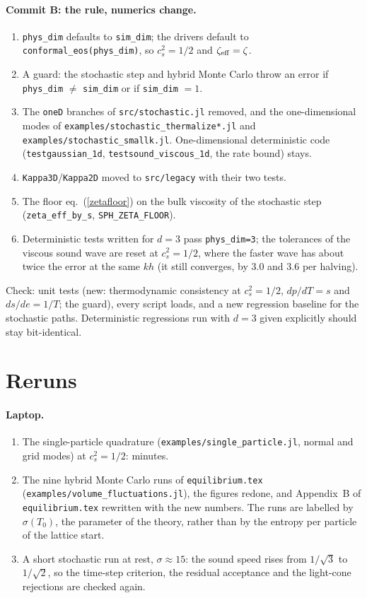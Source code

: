 \documentclass[11pt,aps,preprint,nofootinbib,superscriptaddress,tightenlines]{revtex4-2}
\def\Eq#1{eq.~(\ref{#1})}
\let\oldparagraph\paragraph
\renewcommand{\paragraph}{\par\bigskip\oldparagraph}
\begin{document}
\paragraph{Commit B: the rule, numerics change.}
\begin{enumerate}
\item \texttt{phys\_dim} defaults to \texttt{sim\_dim}; the drivers default to \texttt{conformal\_eos(phys\_dim)}, so $c_s^2=1/2$ and
  $\zeta_{\rm eff}=\zeta$.
\item A guard: the stochastic step and hybrid Monte Carlo throw an error if \texttt{phys\_dim} $\neq$ \texttt{sim\_dim} or if
  \texttt{sim\_dim} $=1$.
\item The \texttt{oneD} branches of \texttt{src/stochastic.jl} removed, and the one-dimensional modes of
  \texttt{examples/stochastic\_thermalize*.jl} and \texttt{examples/stochastic\_smallk.jl}.  One-dimensional deterministic code
  (\texttt{testgaussian\_1d}, \texttt{testsound\_viscous\_1d}, the rate bound) stays.
\item \texttt{Kappa3D}/\texttt{Kappa2D} moved to \texttt{src/legacy} with their two tests.
\item The floor \Eq{zetafloor} on the bulk viscosity of the stochastic step (\texttt{zeta\_eff\_by\_s}, \texttt{SPH\_ZETA\_FLOOR}).
\item Deterministic tests written for $d=3$ pass \texttt{phys\_dim=3}; the tolerances of the viscous sound wave are reset at
  $c_s^2=1/2$, where the faster wave has about twice the error at the same $kh$ (it still converges, by $3.0$ and $3.6$ per halving).
\end{enumerate}
Check: unit tests (new: thermodynamic consistency at $c_s^2=1/2$, $dp/dT=s$ and $ds/de=1/T$; the guard), every script loads, and a new
regression baseline for the stochastic paths.  Deterministic regressions run with $d=3$ given explicitly should stay bit-identical.

\section{Reruns}

\paragraph{Laptop.}
\begin{enumerate}
\item The single-particle quadrature (\texttt{examples/single\_particle.jl}, normal and grid modes) at $c_s^2=1/2$: minutes.
\item The nine hybrid Monte Carlo runs of \texttt{equilibrium.tex} (\texttt{examples/volume\_fluctuations.jl}), the figures redone, and
  Appendix~B of \texttt{equilibrium.tex} rewritten with the new numbers.  The runs are labelled by $\sigma(T_0)$, the parameter of the
  theory, rather than by the entropy per particle of the lattice start.
\item A short stochastic run at rest, $\sigma\approx 15$: the sound speed rises from $1/\sqrt3$ to $1/\sqrt2$, so the time-step criterion,
  the residual acceptance and the light-cone rejections are checked again.
\end{enumerate}
\end{document}
